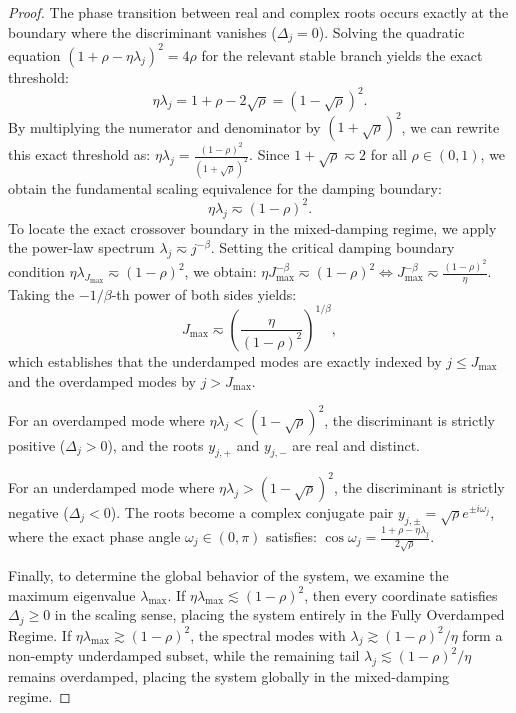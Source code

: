 \documentclass[11pt]{article}
\begin{document}
\begin{proof}
The phase transition between real and complex roots occurs exactly at the boundary where the discriminant vanishes ($\Delta_j = 0$). Solving the quadratic equation $(1+\rho-\eta\lambda_j)^2 = 4\rho$ for the relevant stable branch yields the exact threshold:
\[
    \eta\lambda_j = 1 + \rho - 2\sqrt{\rho} = (1-\sqrt{\rho})^2.
\]
By multiplying the numerator and denominator by $(1+\sqrt{\rho})^2$, we can rewrite this exact threshold as: $\eta\lambda_j = \frac{(1-\rho)^2}{(1+\sqrt{\rho})^2}.$
Since $1+\sqrt{\rho} \eqsim 2$ for all $\rho \in (0, 1)$, we obtain the fundamental scaling equivalence for the damping boundary:
\[
    \eta\lambda_j \eqsim (1-\rho)^2.
\]
To locate the exact crossover boundary in the mixed-damping regime, we apply the power-law spectrum $\lambda_j \eqsim j^{-\beta}$. Setting the critical damping boundary condition $\eta\lambda_{J_{\max}} \eqsim (1-\rho)^2$, we obtain: 
$\eta J_{\max}^{-\beta} \eqsim (1-\rho)^2  \Longleftrightarrow  J_{\max}^{-\beta} \eqsim \frac{(1-\rho)^2}{\eta}.$
Taking the $-1/\beta$-th power of both sides yields:
\[
    J_{\max} \eqsim \left(\frac{\eta}{(1-\rho)^2}\right)^{1/\beta},
\]
which establishes that the underdamped modes are exactly indexed by $j \le J_{\max}$ and the overdamped modes by $j > J_{\max}$.

For an overdamped mode where $\eta\lambda_j < (1-\sqrt{\rho})^2$, the discriminant is strictly positive ($\Delta_j > 0$), and the roots $y_{j,+}$ and $y_{j,-}$ are real and distinct.

For an underdamped mode where $\eta\lambda_j > (1-\sqrt{\rho})^2$, the discriminant is strictly negative ($\Delta_j < 0$). The roots become a complex conjugate pair $y_{j,\pm} = \sqrt{\rho} e^{\pm i \omega_j}$, where the exact phase angle $\omega_j \in (0, \pi)$ satisfies:
$\cos\omega_j = \frac{1+\rho-\eta\lambda_j}{2\sqrt{\rho}}.$

Finally, to determine the global behavior of the system, we examine the maximum eigenvalue $\lambda_{\max}$. If $\eta\lambda_{\max} \lesssim (1-\rho)^2$, then every coordinate satisfies $\Delta_j \ge 0$ in the scaling sense, placing the system entirely in the Fully Overdamped Regime. If $\eta\lambda_{\max} \gtrsim (1-\rho)^2$, the spectral modes with $\lambda_j \gtrsim (1-\rho)^2/\eta$ form a non-empty underdamped subset, while the remaining tail $\lambda_j \lesssim (1-\rho)^2/\eta$ remains overdamped, placing the system globally in the mixed-damping regime.
\end{proof}
\end{document}
